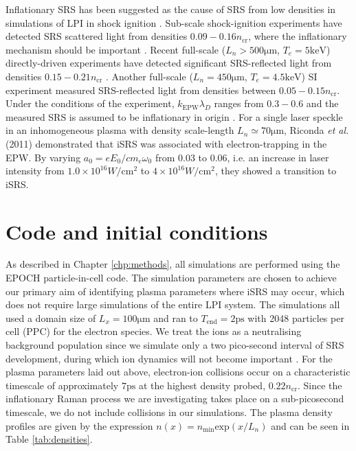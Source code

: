  Inflationary SRS has been suggested as the cause of SRS from low densities
 in simulations of LPI in shock ignition \cite{Klimo2014}. Sub-scale shock-ignition experiments have detected
 SRS scattered light from densities $0.09 - 0.16 n_\mathrm{cr}$, where the inflationary mechanism should be important \cite{Cristoforetti2017}. Recent full-scale ($L_n > 500
 \si{\micro\metre}$, $T_e = 5\si{\kilo \electronvolt}$) directly-driven experiments have detected significant SRS-reflected light from densities $0.15 - 0.21 n_{\mathrm{cr}}$ \cite{Rosenberg2020}. Another full-scale ($L_n = 450
 \si{\micro\metre}$, $T_e = 4.5\si{\kilo \electronvolt}$) SI experiment measured SRS-reflected light from densities between $0.05 - 0.15 n_{\mathrm{cr}}$. Under the conditions of the experiment, $k_{\mathrm{EPW}}\lambda_D$ ranges from $0.3 - 0.6$ and the measured SRS is assumed to be inflationary in origin \cite{Baton2020}.
 For a single laser speckle in an inhomogeneous plasma with density
 scale-length $L_n\simeq 70 \si{\micro\metre}$, Riconda {\it et al.} (2011) \cite{Riconda2011} demonstrated
 that iSRS  was associated
 with electron-trapping in the EPW. By varying $a_0=eE_0/c m_e \omega_0$ from 0.03 to 0.06, i.e. an increase in
 laser intensity from $1.0\times10^{16} \si{W/\centi\metre^2}$ to $4\times10^{16} \si{W/\centi\metre^2}$, they showed
 a transition to iSRS.

\section{Code and initial conditions}\label{sec:code&IC}
As described in Chapter \ref{chp:methods}, all simulations are performed using the EPOCH \cite{Arber2015} particle-in-cell code. The simulation parameters are chosen to achieve our primary aim of identifying plasma parameters where iSRS may occur, which does not require large simulations of the entire LPI system. The simulations all used a domain size of $L_x = 100\si{\micro\metre} $ and ran to $T_\mathrm{end} = 2\si{\pico\second}$
with 2048
particles per cell (PPC) for the electron species.
We treat the ions as a neutralising background population since we simulate only a two pico-second interval of SRS
development, during which ion dynamics will not become important \cite{Rousseaux2006}.
For the plasma parameters laid out above, electron-ion collisions occur on a characteristic timescale of approximately
$7 \si{\pico\second}$ at the highest density probed, $0.22n_\mathrm{cr}$. Since the inflationary Raman process we
are investigating takes place
on a sub-picosecond timescale, we do not include collisions in our simulations.
The plasma density profiles are given by the expression $n(x) = n_\mathrm{min}\mathrm{exp}(x/L_n)$ and can be seen in Table
\ref{tab:densities}.

